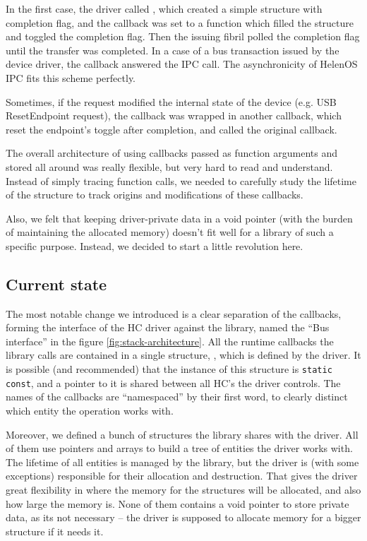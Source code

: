 In the first case, the driver called , which created
a simple structure with completion flag, and the callback was set to a function
which filled the structure and toggled the completion flag. Then the issuing
fibril polled the completion flag until the transfer was completed. In a case
of a bus transaction issued by the device driver, the callback answered the IPC
call. The asynchronicity of HelenOS IPC fits this scheme perfectly.

Sometimes, if the request modified the internal state of the device (e.g. USB
ResetEndpoint request), the callback was wrapped in another callback, which
reset the endpoint's toggle after completion, and called the original callback.

The overall architecture of using callbacks passed as function arguments and
stored all around was really flexible, but very hard to read and understand.
Instead of simply tracing function calls, we needed to carefully study the
lifetime of the structure to track origins and modifications of these
callbacks.

Also, we felt that keeping driver-private data in a void pointer (with the
burden of maintaining the allocated memory) doesn't fit well for a library of
such a specific purpose. Instead, we decided to start a little revolution here.

\subsection{Current state}

The most notable change we introduced is a clear separation of the callbacks,
forming the interface of the HC driver against the  library,
named the ``Bus interface'' in the figure \ref{fig:stack-architecture}. All the
runtime callbacks the library calls are contained in a single structure,
, which is defined by the driver. It is possible (and
recommended) that the instance of this structure is \texttt{static
const}, and a pointer to it is shared between all HC's the driver controls. The
names of the callbacks are ``namespaced'' by their first word, to clearly
distinct which entity the operation works with.

Moreover, we defined a bunch of structures the library shares with the driver.
All of them use pointers and arrays to build a tree of entities the driver
works with. The lifetime of all entities is managed by the library, but the
driver is (with some exceptions) responsible for their allocation and
destruction. That gives the driver great flexibility in where the memory for
the structures will be allocated, and also how large the memory is. None of
them contains a void pointer to store private data, as its not necessary -- the
driver is supposed to allocate memory for a bigger structure if it needs it.

